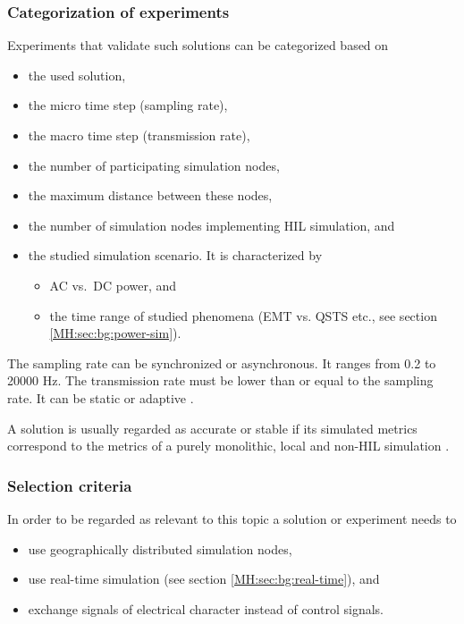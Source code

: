\documentclass[a4paper]{atseminar}
\begin{document}
\subsubsection{Categorization of experiments}
\label{MH:sec:cat-exp}

Experiments that validate such solutions can be categorized based on

\begin{itemize}
    \item the used solution,
    \item the micro time step (sampling rate),
    \item the macro time step (transmission rate), 
    \item the number of participating simulation nodes,
    \item the maximum distance between these nodes,
    \item the number of simulation nodes implementing HIL simulation, and
    \item the studied simulation scenario. It is characterized by
    \begin{itemize}
        \item AC vs.~DC power, and
        \item the time range of studied phenomena (EMT vs. QSTS etc., see section \ref{MH:sec:bg:power-sim}).
    \end{itemize}
\end{itemize}

The sampling rate can be synchronized or asynchronous. It ranges from 0.2 to 20000 Hz.
The transmission rate must be lower than or equal to the sampling rate. It can be static or adaptive \cite{vogel2019improve}.

A solution is usually regarded as accurate or stable if its simulated metrics correspond to the metrics of a purely monolithic, local and non-HIL simulation \cite{montoya2020}.

\subsubsection{Selection criteria}
\label{MH:sec:selection}

In order to be regarded as relevant to this topic a solution or experiment needs to

\begin{itemize}

	\item use geographically distributed simulation nodes,
    \item use real-time simulation (see section \ref{MH:sec:bg:real-time}), and
	\item exchange signals of electrical character instead of control signals.

\end{itemize}
\end{document}
